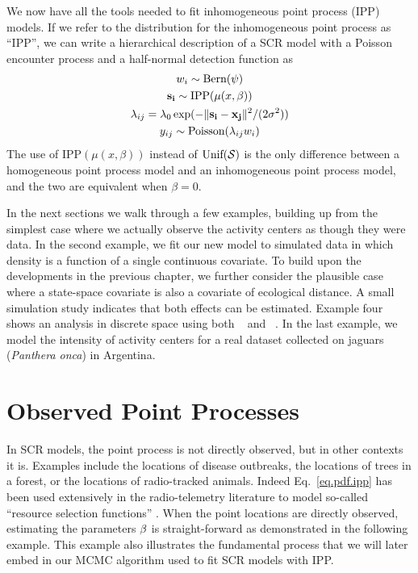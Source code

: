 We now have all the tools needed to fit inhomogeneous point process
(IPP) models. If we refer to the distribution for the
inhomogeneous point process as ``IPP'', we can write a
hierarchical description of a SCR model with a Poisson encounter process and
a half-normal detection function as
\begin{gather*}
w_i \sim \mbox{Bern}(\psi) \\
{\bf s_i} \sim \mbox{IPP}(\mu(x,\beta)) \\
\lambda_{ij} = \lambda_0 \exp(-\|{\bf s_i} - {\bf x_{j}}\|^2/(2\sigma^2)) \\
y_{ij} \sim \mbox{Poisson}(\lambda_{ij} w_i)
\end{gather*}
The use of $\mbox{IPP}(\mu(x, \beta))$ instead of
$\mbox{Unif}(\cal{S})$ is the only difference between a homogeneous
point process model and an inhomogeneous point process model, and the
two are equivalent when $\beta=0$.

In the next sections we walk through a few examples, building up from
the simplest case where we actually observe the activity centers as
though they were data. In the second example, we fit our new model to simulated
data in which density is a function of a single continuous
covariate. To build upon the developments in the previous chapter, we
further consider the plausible case where a state-space covariate is also a
covariate of ecological distance. A small simulation study indicates
that both effects can be estimated. Example four shows an analysis in discrete space using
both \secr~\citep{efford:2011} and \jags~\citep{plummer:2003}. In the
last example, we model the intensity of
activity centers for a real dataset collected on jaguars
(\emph{Panthera onca}) in Argentina.

\section{Observed Point Processes}

In SCR models, the point process is not directly observed, but in
other contexts it is. Examples include the locations of disease
outbreaks, the locations of trees in a forest, or the locations of
radio-tracked animals. Indeed Eq.~\ref{eq.pdf.ipp} has been used
extensively in the radio-telemetry literature to model so-called
``resource selection functions'' \citep{manly_etal:2002,lele_keim:2006}.
When the point locations are directly observed,
estimating the parameters $\bf \beta$ is straight-forward as
demonstrated in the following example. This example also illustrates
the fundamental process that we will later embed in our MCMC algorithm
used to fit SCR models with IPP.

